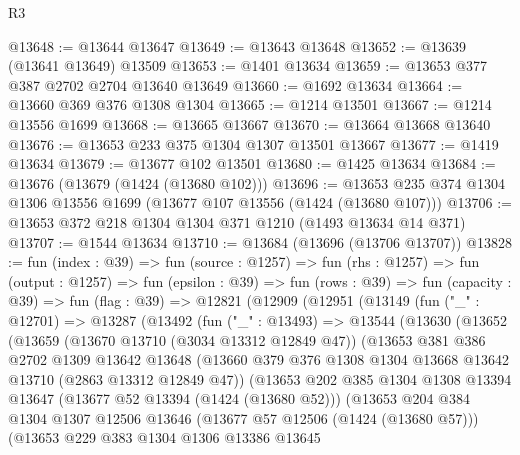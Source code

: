 \begin{lexlean}{R3}
\begin{coremodule}
@13648 := @13644 @13647
@13649 := @13643 @13648
@13652 := @13639 (@13641 @13649) @13509
@13653 := @1401 @13634
@13659 := @13653 @377 @387 @2702 @2704 @13640 @13649
@13660 := @1692 @13634
@13664 := @13660 @369 @376 @1308 @1304
@13665 := @1214 @13501
@13667 := @1214 @13556 @1699
@13668 := @13665 @13667
@13670 := @13664 @13668 @13640
@13676 := @13653 @233 @375 @1304 @1307 @13501 @13667
@13677 := @1419 @13634
@13679 := @13677 @102 @13501
@13680 := @1425 @13634
@13684 := @13676 (@13679 (@1424 (@13680 @102)))
@13696 := @13653 @235 @374 @1304 @1306 @13556 @1699 (@13677 @107 @13556 (@1424 (@13680 @107)))
@13706 := @13653 @372 @218 @1304 @1304 @371 @1210 (@1493 @13634 @14 @371)
@13707 := @1544 @13634
@13710 := @13684 (@13696 (@13706 @13707))
@13828 := fun (index : @39) =>
  fun (source : @1257) =>
  fun (rhs : @1257) =>
  fun (output : @1257) =>
  fun (epsilon : @39) =>
  fun (rows : @39) =>
  fun (capacity : @39) =>
  fun (flag : @39) =>
  @12821
    (@12909
      (@12951
        (@13149
          (fun ("_" : @12701) =>
          @13287
            (@13492
              (fun ("_" : @13493) =>
              @13544
                (@13630
                  (@13652
                    (@13659
                      (@13670 @13710 (@3034 @13312 @12849 @47))
                      (@13653
                        @381
                        @386
                        @2702
                        @1309
                        @13642
                        @13648
                        (@13660
                          @379
                          @376
                          @1308
                          @1304
                          @13668
                          @13642
                          @13710
                          (@2863 @13312 @12849 @47))
                        (@13653
                          @202
                          @385
                          @1304
                          @1308
                          @13394
                          @13647
                          (@13677 @52 @13394 (@1424 (@13680 @52)))
                          (@13653
                            @204
                            @384
                            @1304
                            @1307
                            @12506
                            @13646
                            (@13677 @57 @12506 (@1424 (@13680 @57)))
                            (@13653
                              @229
                              @383
                              @1304
                              @1306
                              @13386
                              @13645

\end{coremodule}
\end{lexlean}
